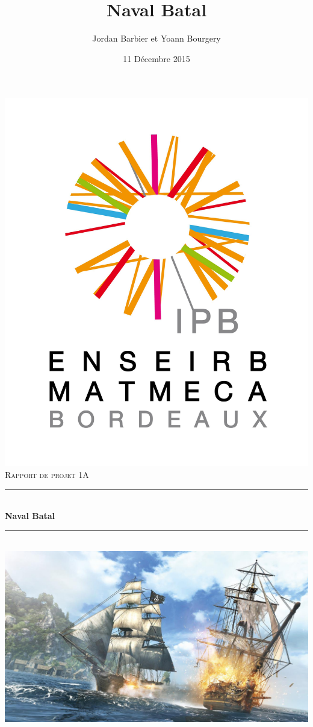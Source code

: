 \documentclass[11pt]{article}
\title{Naval Batal}
\author{Jordan Barbier et Yoann Bourgery }
\date{11 Décembre 2015}
\begin{document}
\begin{titlepage}
  \begin{sffamily}
    \begin{center}
      \includegraphics[scale=0.07]{image/enseirb-matmeca.png}\\
      \vspace{1cm}
      \textsc{\LARGE Rapport de projet 1A}\\
      \vspace{1.5cm}
      \rule{\linewidth}{.5pt}
      \vspace{0.5cm}
      \\
      {\huge \bfseries Naval Batal}
      \\
      \vspace{0.5cm}
      \rule{\linewidth}{.5pt}\\
      \vspace{0.5cm}
      \includegraphics[scale=0.3]{image/Naval_battle.png}\\

\end{center}
\end{sffamily}
\end{titlepage}
\end{document}
